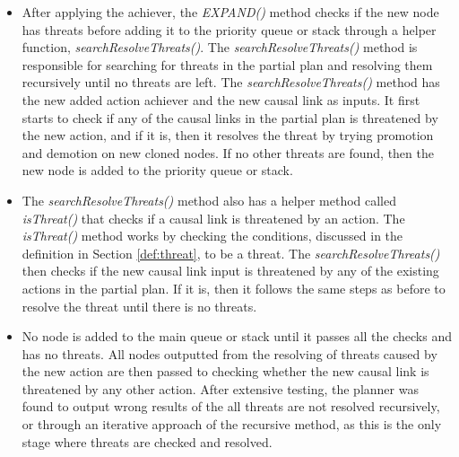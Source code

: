 \begin{itemize}
\begin{itemize}
              \item After applying the achiever, the \textit{EXPAND()} method checks if the new node has threats before adding it to the priority queue or stack through a helper function, \textit{searchResolveThreats()}. The \textit{searchResolveThreats()} method is responsible for searching for threats in the partial plan and resolving them recursively until no threats are left. The \textit{searchResolveThreats()} method has the new added action achiever and the new causal link as inputs. It first starts to check if any of the causal links in the partial plan is threatened by the new action, and if it is, then it resolves the threat by trying promotion and demotion on new cloned nodes. If no other threats are found, then the new node is added to the priority queue or stack.

              \item The \textit{searchResolveThreats()} method also has a helper method called \textit{isThreat()} that checks if a causal link is threatened by an action. The \textit{isThreat()} method works by checking the conditions, discussed in the definition in Section \ref{def:threat}, to be a threat. The \textit{searchResolveThreats()} then checks if the new causal link input is threatened by any of the existing actions in the partial plan. If it is, then it follows the same steps as before to resolve the threat until there is no threats.

              \item No node is added to the main queue or stack until it passes all the checks and has no threats. All nodes outputted from the resolving of threats caused by the new action are then passed to checking whether the new causal link is threatened by any other action. After extensive testing, the planner was found to output wrong results of the all threats are not resolved recursively, or through an iterative approach of the recursive method, as this is the only stage where threats are checked and resolved.
          \end{itemize}


\end{itemize}
